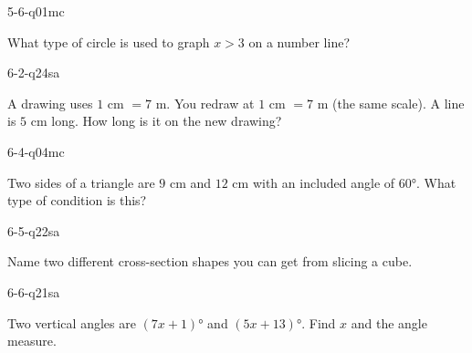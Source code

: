 \begin{practiceQuestion}{5-6-q01}{mc}
\begin{questionText}
What type of circle is used to graph $x > 3$ on a number line?
\end{questionText}
\end{practiceQuestion}

\begin{practiceQuestion}{6-2-q24}{sa}
\begin{questionText}
A drawing uses $1$ cm $= 7$ m. You redraw at $1$ cm $= 7$ m (the same scale). A line is $5$ cm long. How long is it on the new drawing?
\end{questionText}
\end{practiceQuestion}

\begin{practiceQuestion}{6-4-q04}{mc}
\begin{questionText}
Two sides of a triangle are $9$ cm and $12$ cm with an included angle of $60°$. What type of condition is this?
\end{questionText}
\end{practiceQuestion}

\begin{practiceQuestion}{6-5-q22}{sa}
\begin{questionText}
Name two different cross-section shapes you can get from slicing a cube.
\end{questionText}
\end{practiceQuestion}

\begin{practiceQuestion}{6-6-q21}{sa}
\begin{questionText}
Two vertical angles are $(7x + 1)°$ and $(5x + 13)°$. Find $x$ and the angle measure.
\end{questionText}
\end{practiceQuestion}

